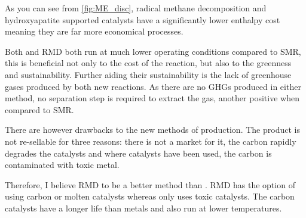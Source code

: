 As you can see from \ref{fig:ME_disc}, radical methane decomposition and hydroxyapatite supported  catalysts have a significantly lower enthalpy cost meaning they are far more economical processes.

Both  and RMD both run at much lower operating conditions compared to SMR, this is beneficial not only to the cost of the reaction, but also to the greenness and sustainability.
Further aiding their sustainability is the lack of greenhouse gases produced by both new reactions.
As there are no GHGs produced in either method, no separation step is required to extract the  gas, another positive when compared to SMR.

There are however drawbacks to the new methods of production.
The product is not re-sellable for three reasons: there is not a market for it, the carbon rapidly degrades the catalysts and where  catalysts have been used, the carbon is contaminated with toxic metal.

Therefore, I believe RMD to be a better method than .
RMD has the option of using carbon or molten catalysts whereas  only uses toxic  catalysts.
The carbon catalysts have a longer life than metals and also run at lower temperatures.

